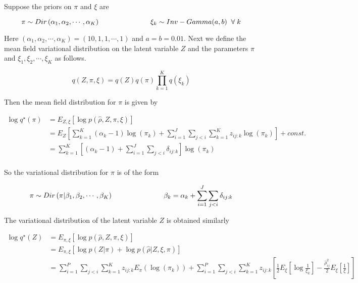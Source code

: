 Suppose the priors on $\pi$ and $\xi$ are 

\begin{equation}
\pi \sim Dir \left ( \alpha_1, \alpha_2, \cdots, \alpha_{K} \right ) \hspace{1 in} \xi_{k} \sim Inv-Gamma(a, b) \;\; \forall \; k 
\end{equation}

Here $ \left ( \alpha_1, \alpha_2, \cdots, \alpha_{K} \right ) = \left (10, 1, 1, \cdots, 1 \right )$ and $a=b=0.01$.
Next we define the mean field variational distribution on the latent variable $Z$ and the parameters $\pi$ and $\xi_1, \xi_2, \cdots, \xi_{K}$ as follows. 

\begin{equation}
q(Z, \pi, \xi) = q(Z) q(\pi) \prod_{k=1}^{K} q(\xi_{k})  
\end{equation}

Then the mean field distribution for $\pi$ is given by 

\begin{align}
\log q^{\star} (\pi)  & = E_{Z, \xi} \left [   \log p (\hat{\rho}, Z, \pi, \xi ) \right ]   \\
			    & = E_{Z} \left [ \sum_{k=1}^{K} \left (\alpha_{k} - 1\right) \log (\pi_k) + \sum_{i=1}^{J} \sum_{j < i} \sum_{k=1}^{K} z_{ij:k} \log (\pi_{k} ) \right ]  + const. \\
			    & = \sum_{k=1}^{K} \left [   \left (\alpha_{k} - 1\right)  + \sum_{i=1}^{J} \sum_{j < i}  \delta_{ij:k} \right]\log (\pi_{k})  \\
\end{align}

So the variational distribution for $\pi$ is of the form 

\begin{equation}
\pi \sim Dir \left (   \pi | \beta_1, \beta_2, \cdots, \beta_{K} \right ) \hspace{1 in}   \beta_{k} = \alpha_{k} + \sum_{i=1}^{J} \sum_{j < i} \delta_{ij:k} 
\end{equation}

The variational distribution of the latent variable $Z$ is obtained similarly

\begin{align}
\log q^{\star} (Z)  & = E_{\pi, \xi} \left [  \log p ( \hat{\rho}, Z, \pi, \xi ) \right ]   \\
			  & = E_{\pi, \xi} \left [   \log p(Z | \pi) +  \log p (\hat{\rho} | Z, \xi, \pi) \right ] \\
			  & = \sum_{i=1}^{P} \sum_{j < i}  \sum_{k=1}^{K} z_{ij:k} E_{\pi} \left (  \log (\pi_{k}) \right)  + \sum_{i=1}^{P} \sum_{j < i}  \sum_{k=1}^{K} z_{ij:k}  \left [ \frac{1}{2}  E_{\xi} \left [ \log \frac{1}{\xi_{k}} \right] - \frac{\hat{\rho}^2_{ij}}{2}  E_{\xi} \left [ \frac{1}{\xi} \right ] \right] \\
\end{align}


